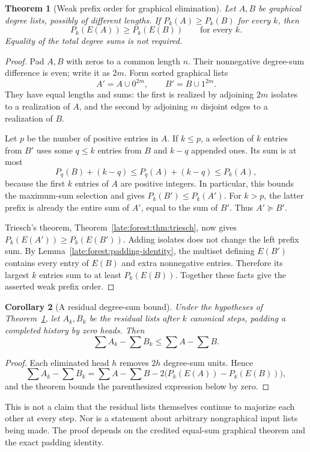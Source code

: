 \documentclass[11pt,a4paper]{article}
\newtheorem{theorem}{Theorem}[section]
\newtheorem{corollary}[theorem]{Corollary}
\theoremstyle{definition}\newtheorem{definition}[theorem]{Definition}
\theoremstyle{remark}\newtheorem{remark}[theorem]{Remark}
\begin{document}
\begin{theorem}[Weak prefix order for graphical elimination]
\label{late:forest:weak-majorization}
Let $A,B$ be graphical degree lists, possibly of different lengths.
If $P_k(A)\ge P_k(B)$ for every $k$, then
\[
 P_k(E(A))\ge P_k(E(B))\qquad\text{for every }k.
\]
Equality of the total degree sums is not required.
\end{theorem}
\begin{proof}
Pad $A,B$ with zeros to a common length $n$. Their nonnegative degree-sum
difference is even; write it as $2m$. Form sorted graphical lists
\[
 A'=A\cup0^{2m},\qquad B'=B\cup1^{2m}.
\]
They have equal lengths and sums: the first is realized by adjoining
$2m$ isolates to a realization of $A$, and the second by adjoining $m$
disjoint edges to a realization of $B$.

Let $p$ be the number of positive entries in $A$. If $k\le p$, a
selection of $k$ entries from $B'$ uses some $q\le k$ entries from
$B$ and $k-q$ appended ones. Its sum is at most
\[
 P_q(B)+(k-q)\le P_q(A)+(k-q)\le P_k(A),
\]
because the first $k$ entries of $A$ are positive integers. In
particular, this bounds the maximum-sum selection and gives
$P_k(B')\le P_k(A')$. For $k>p$, the latter prefix is already the
entire sum of $A'$, equal to the sum of $B'$. Thus $A'\succeq B'$.

Triesch's theorem, Theorem~\ref{late:forest:thm:triesch}, now gives
$P_k(E(A'))\ge P_k(E(B'))$. Adding isolates does not change the left
prefix sum. By Lemma~\ref{late:forest:padding-identity}, the multiset
defining $E(B')$ contains every entry of $E(B)$ and extra nonnegative
entries. Therefore its largest $k$ entries sum to at least $P_k(E(B))$.
Together these facts give the asserted weak prefix order.
\end{proof}

\begin{corollary}[A residual degree-sum bound]\label{late:forest:gap}
Under the hypotheses of Theorem~\ref{late:forest:weak-majorization}, let
$A_k,B_k$ be the residual lists after $k$ canonical steps, padding a
completed history by zero heads. Then
\[
 \sum A_k-\sum B_k\le\sum A-\sum B.
\]
\end{corollary}
\begin{proof}
Each eliminated head $h$ removes $2h$ degree-sum units. Hence
\[
 \sum A_k-\sum B_k
 =\sum A-\sum B
  -2\bigl(P_k(E(A))-P_k(E(B))\bigr),
\]
and the theorem bounds the parenthesized expression below by zero.
\end{proof}
This is not a claim that the residual lists themselves continue to
majorize each other at every step. Nor is a statement about arbitrary
nongraphical input lists being made. The proof depends on the credited
equal-sum graphical theorem and the exact padding identity.
\end{document}
